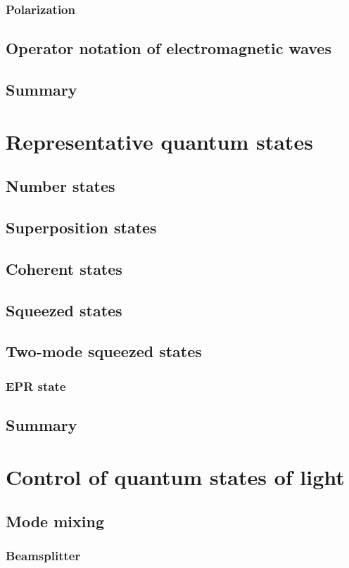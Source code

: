 \documentclass{book}
\begin{document}
\subsection{Polarization}
\section{Operator notation of electromagnetic waves}
\section{Summary}

\chapter{Representative quantum states}
\section{Number states}
\section{Superposition states}
\section{Coherent states}
\section{Squeezed states}
\section{Two-mode squeezed states}
\subsection{EPR state}
\section{Summary}

\chapter{Control of quantum states of light}
\section{Mode mixing}
\subsection{Beamsplitter}
\end{document}
